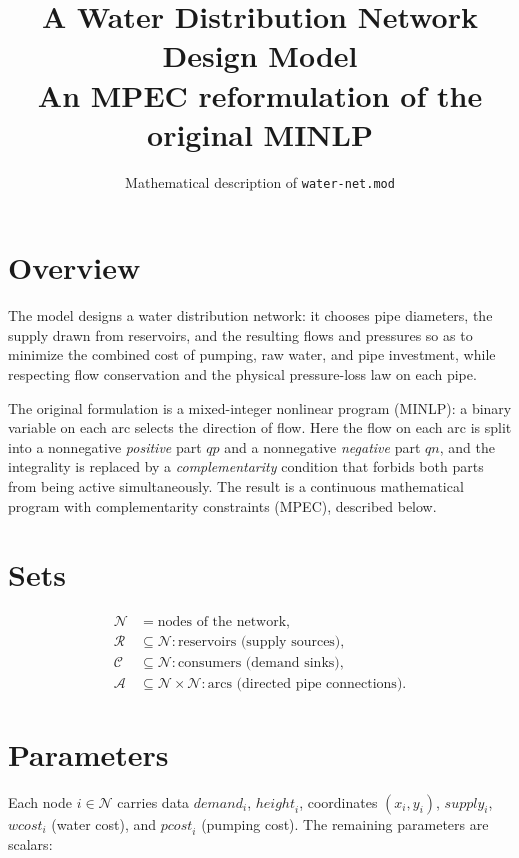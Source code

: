 \documentclass[11pt]{article}
\title{A Water Distribution Network Design Model\\
\large An MPEC reformulation of the original MINLP}
\author{Mathematical description of \texttt{water-net.mod}}
\date{}
\newcommand{\R}{\mathcal{R}}   %
\newcommand{\Cs}{\mathcal{C}}  %
\newcommand{\N}{\mathcal{N}}   %
\newcommand{\A}{\mathcal{A}}   %
\begin{document}
\maketitle

\section{Overview}

The model designs a water distribution network: it chooses pipe diameters,
the supply drawn from reservoirs, and the resulting flows and pressures so as
to minimize the combined cost of pumping, raw water, and pipe investment, while
respecting flow conservation and the physical pressure-loss law on each pipe.

The original formulation is a mixed-integer nonlinear program (MINLP): a binary
variable on each arc selects the direction of flow. Here the flow on each arc is
split into a nonnegative \emph{positive} part $qp$ and a nonnegative
\emph{negative} part $qn$, and the integrality is replaced by a
\emph{complementarity} condition that forbids both parts from being active
simultaneously. The result is a continuous mathematical program with
complementarity constraints (MPEC), described below.

\section{Sets}

\begin{align*}
\N &= \text{nodes of the network},\\
\R &\subseteq \N : \text{reservoirs (supply sources)},\\
\Cs &\subseteq \N : \text{consumers (demand sinks)},\\
\A &\subseteq \N \times \N : \text{arcs (directed pipe connections)}.
\end{align*}

\section{Parameters}

Each node $i \in \N$ carries data
$\mathit{demand}_i$, $\mathit{height}_i$, coordinates $(x_i, y_i)$,
$\mathit{supply}_i$, $\mathit{wcost}_i$ (water cost), and
$\mathit{pcost}_i$ (pumping cost). The remaining parameters are scalars:
\end{document}
